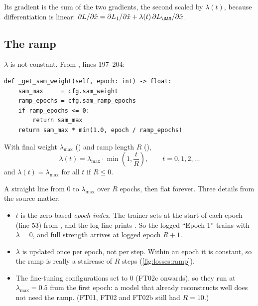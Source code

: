 Its gradient is the sum of the two gradients, the second scaled by $\lambda(t)$, because
differentiation is linear: $\partial L/\partial\hat{x} = \partial L_1/\partial\hat{x} +
\lambda(t)\,\partial L_{\SAM}/\partial\hat{x}$.

\subsection{The ramp}

$\lambda$ is not constant. From
, lines 197--204:
\begin{lstlisting}
def _get_sam_weight(self, epoch: int) -> float:
    sam_max     = cfg.sam_weight
    ramp_epochs = cfg.sam_ramp_epochs
    if ramp_epochs <= 0:
        return sam_max
    return sam_max * min(1.0, epoch / ramp_epochs)
\end{lstlisting}
\begin{definition}
With final weight $\lambda_{\max}$ () and ramp length $R$
(),
\begin{equation}\label{eq:losses:ramp}
\lambda(t) = \lambda_{\max}\cdot\min\!\left(1, \frac{t}{R}\right), \qquad t = 0, 1, 2, \dots
\end{equation}
and $\lambda(t) = \lambda_{\max}$ for all $t$ if $R \le 0$.
\end{definition}
A straight line from 0 to $\lambda_{\max}$ over $R$ epochs, then flat forever. Three details
from the source matter.
\begin{itemize}
\item $t$ is the zero-based \emph{epoch index}. The trainer sets  at the start of each epoch (line 53) from , and the
log line prints . So the logged ``Epoch 1'' trains with $\lambda = 0$, and full
strength arrives at logged epoch $R + 1$.
\item $\lambda$ is updated once per epoch, not per step. Within an epoch it is constant, so the
ramp is really a staircase of $R$ steps (\cref{fig:losses:ramp}).
\item The fine-tuning configurations set  to 0 (FT02c onwards), so they
run at $\lambda_{\max} = 0.5$ from the first epoch: a model that already reconstructs well does
not need the ramp. (FT01, FT02 and FT02b still had $R = 10$.)\newline
{}
\end{itemize}

